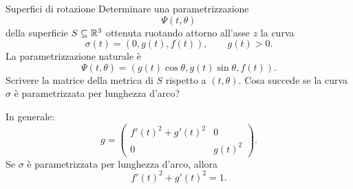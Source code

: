 \documentclass[a4paper]{article}
\begin{document}
\begin{snippetexercise}{Superfici di rotazione}
    Determinare una parametrizzazione
    \[
        \Psi(t,\theta)
    \]
    della superficie \(S\subseteq\mathbb{R}^3\) ottenuta ruotando
    attorno all'asse \(z\) la curva
    \[
        \sigma(t)=\left(0,g(t),f(t)\right),
        \qquad
        g(t)>0.
    \]
    La parametrizzazione naturale è
    \[
        \Psi(t,\theta)
        =
        \left(
            g(t)\cos\theta,
            g(t)\sin\theta,
            f(t)
        \right).
    \]
    Scrivere la matrice della metrica di \(S\) rispetto a
    \((t,\theta)\). Cosa succede se la curva \(\sigma\) è
    parametrizzata per lunghezza d'arco?

    In generale:
    \[
        g
        =
        \begin{pmatrix}
            f'(t)^2+g'(t)^2 & 0\\
            0 & g(t)^2
        \end{pmatrix}.
    \]
    Se \(\sigma\) è parametrizzata per lunghezza d'arco, allora
    \[
        f'(t)^2+g'(t)^2=1.
    \]
\end{snippetexercise}
\end{document}
